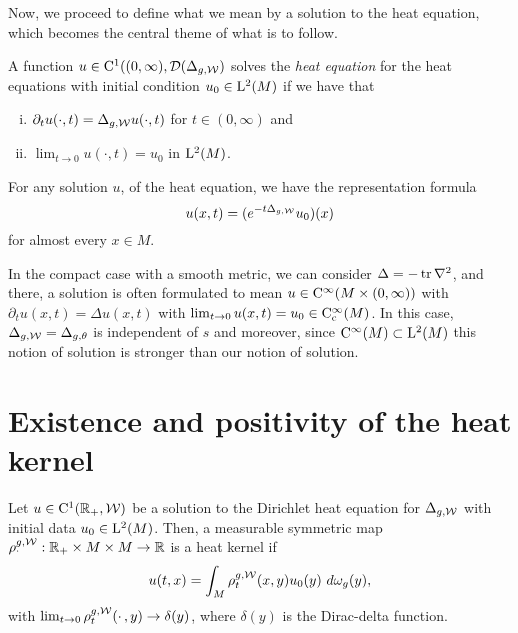 \documentclass[a4paper, 12pt]{amsart}
\begin{document}
Now, we proceed to define what we mean by a solution to the heat
equation, which becomes the central theme of what is to follow.

\begin{defn}
A function \(u \in \Ck{1}((0,\infty),  \dom(\Delta_{g,\cW})\) solves the \emph{heat equation} for 
the heat equations
with initial condition $u_0 \in \Lp{2}(M)$  if we have that
\begin{enumerate}[(i)]
\item  $\partial_t u (\cdot, t) = \Delta_{g,\cW} u(\cdot, t)$ for $t \in (0, \infty)$ and 
\item $\lim_{t \to 0} u(\cdot, t) = u_0$ in $\Lp{2}(M)$.
\end{enumerate}
\end{defn}

For any solution \(u\), of the heat equation, we have the representation formula
\[
u(x,t) = (e^{-t \Delta_{g,\cW}}u_0)(x)
\]
for almost every $x \in M$.
 
\begin{rem}
In the compact case with a smooth metric, we can consider $\Delta = -\tr \nabla^2$,
and there,  a solution is often formulated to mean $u \in \Ck{\infty}( M \times (0, \infty))$
with $\partial_t u(x,t) = \Delta u(x,t)$ with 
$\lim_{t \to 0} u(x,t) = u_0 \in \Ck[c]{\infty}(M)$.
In this case, $\Delta_{g,\cW} = \Delta_{g,\theta}$ is independent
of $s$ and moreover, since $\Ck{\infty}(M) \subset \Lp{2}(M)$
this notion of solution is stronger than our notion of solution.

\end{rem}

\section{Existence and positivity of the heat kernel}

\begin{defn}
Let $u \in \Ck{1}(\R_+, \cW)$ be a solution to the 
Dirichlet heat equation
for $\Delta_{g,\cW}$ with initial data $u_0 \in \Lp{2}(M)$. Then, a 
measurable symmetric map $\hk^{g,\cW}_{\mdot}: \R_+ \times M \times M \to \R$
is a heat kernel if 
$$u(t,x) = \int_{M} \hk^{g,\cW}_t(x,y) u_0(y)\ d\omega_g(y),$$
with $\lim_{t \to 0} \hk_t^{g,\cW}(\mdot,y) \to \delta(y)$, 
where $\delta(y)$ is the Dirac-delta function.
\end{defn}
\end{document}
